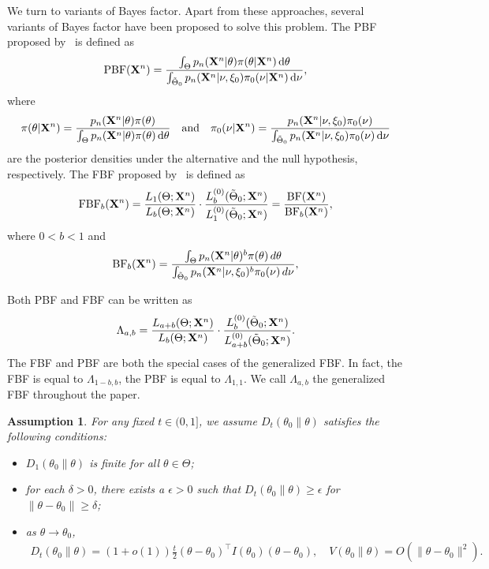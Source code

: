 \documentclass[11pt]{article}
\theoremstyle{plain}
\newtheorem{assumption}{\quad\quad Assumption}
\theoremstyle{definition}
\theoremstyle{remark}
\begin{document}
We turn to variants of Bayes factor.
Apart from these approaches, several variants of Bayes factor have been proposed to solve this problem.
The PBF proposed by~\cite{Aitkin1991Posterior}  is defined as
\begin{equation*}
    \text{PBF}(\mathbf{X}^{n})=
    \frac{\int_{\Theta} p_n(\mathbf{X}^{n}|\theta)\pi(\theta|\mathbf{X}^{n})\, \mathrm d\theta}{\int_{\tilde{\Theta}_0}p_n(\mathbf{X}^{n}|\nu,\xi_0)\pi_0(\nu|\mathbf{X}^{n})\, \mathrm d\nu},
\end{equation*}
where 
\begin{align*}
\pi(\theta|\mathbf{X}^{n})
=
\frac{p_n(\mathbf{X}^{n}|\theta) \pi(\theta)}{\int_{\Theta} p_n(\mathbf{X}^{n}|\theta) \pi(\theta)\, \mathrm d \theta}
    \quad \text{and} \quad 
\pi_0(\nu|\mathbf{X}^{n})
=
\frac{p_n(\mathbf{X}^{n}|\nu,\xi_0)\pi_0(\nu)}{
\int_{\tilde{\Theta}_0} p_n(\mathbf{X}^{n}|\nu,\xi_0)\pi_0(\nu)\, \mathrm d\nu
}
\end{align*}
are the posterior densities under the alternative and the null hypothesis, respectively.
The FBF proposed by~\cite{Fractional1995} is defined as
\begin{equation*}
    \text{FBF}_b(\mathbf{X}^{n})=
    \frac{L_{1}(\Theta;\mathbf{X}^{n})}{L_{b}(\Theta;\mathbf{X}^{n})}\cdot \frac{L_{b}^{(0)}(\tilde{\Theta}_0;\mathbf{X}^{n})}{L_{1}^{(0)}(\tilde{\Theta}_0;\mathbf{X}^{n})}
    = \frac{\text{BF}(\mathbf{X}^{n})}{\text{BF}_b (\mathbf{X}^{n})}
    ,
\end{equation*}
where $0<b<1$ and 
\begin{align*}
    \text{BF}_b (\mathbf{X}^{n})=
    \frac{\int_{\Theta} p_n(\mathbf{X}^{n}|\theta)^b \pi(\theta)\, d\theta}{\int_{\tilde{\Theta}_0}p_n(\mathbf{X}^{n}|\nu,\xi_0)^b \pi_0(\nu)\, d\nu},
\end{align*}




Both PBF and FBF can be written as
$$
    \Lambda_{a,b}=
    \frac{L_{a+b}(\Theta;\mathbf{X}^{n})}{L_{b}(\Theta;\mathbf{X}^{n})}\cdot \frac{L_{b}^{(0)}(\tilde{\Theta}_0;\mathbf{X}^{n})}{L_{a+b}^{(0)}(\tilde{\Theta}_0;\mathbf{X}^{n})}.
$$
The FBF and PBF are both the special cases of the generalized FBF.
In fact, the FBF is equal to $\Lambda_{1-b,b}$, the PBF is equal to $\Lambda_{1,1}$.
We call $\Lambda_{a,b}$ the generalized FBF throughout the paper.


\begin{assumption}
    For any fixed $t \in (0,1]$,
    we assume $D_t\left( \theta_0 \| \theta \right)$ satisfies the following conditions:
    \begin{itemize}
        \item 
    $D_1(\theta_0 \| \theta)$ is finite for all $\theta \in \Theta$;
\item
    for each $\delta >0$,
    there exists a $\epsilon>0$ such that $D_t\left( \theta_0 \| \theta \right)\geq \epsilon$ for $\|\theta-\theta_0\| \geq \delta$;
\item
    as $\theta \to \theta_0$, 
    \begin{align*}
        D_t(\theta_0 \| \theta) = (1+o(1))\frac{t}{2} (\theta -\theta_0)^\top I(\theta_0) (\theta - \theta_0),\quad
        V(\theta_0 \| \theta ) = O\left( \|\theta - \theta_0\|^2 \right)
        .
    \end{align*}
    \end{itemize}
    \label{assumption2019}
\end{assumption}
\end{document}
